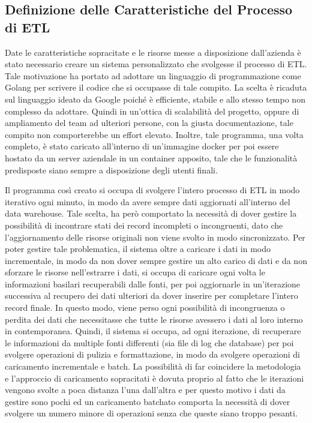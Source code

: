\subsection{Definizione delle Caratteristiche del Processo di ETL}

Date le caratteristiche sopracitate e le risorse messe a disposizione dall'azienda è stato necessario creare un sistema personalizzato che svolgesse il processo di ETL. Tale motivazione ha portato ad adottare un linguaggio di programmazione come Golang per scrivere il codice che si occupasse di tale compito. La scelta è ricaduta sul linguaggio ideato da Google poiché è efficiente, stabile e allo stesso tempo non complesso da adottare. Quindi in un'ottica di scalabilità del progetto, oppure di ampliamento del team ad ulteriori persone, con la giusta documentazione, tale compito non comporterebbe un effort elevato. Inoltre, tale programma, una volta completo, è stato caricato all'interno di un'immagine docker per poi essere hostato da un server aziendale in un container apposito, tale che le funzionalità predisposte siano sempre a disposizione degli utenti finali.

Il programma così creato si occupa di svolgere l'intero processo di ETL in modo iterativo ogni minuto, in modo da avere sempre dati aggiornati all'interno del data warehouse. Tale scelta, ha però comportato la necessità di dover gestire la possibilità di incontrare stati dei record incompleti o incongruenti, dato che l'aggiornamento delle risorse originali non viene svolto in modo sincronizzato. Per poter gestire tale problematica, il sistema oltre a caricare i dati in modo incrementale, in modo da non dover sempre gestire un alto carico di dati e da non sforzare le risorse nell'estrarre i dati, si occupa di caricare ogni volta le informazioni basilari recuperabili dalle fonti, per poi aggiornarle in un'iterazione successiva al recupero dei dati ulteriori da dover inserire per completare l'intero record finale. In questo modo, viene perso ogni possibilità di incongruenza o perdita dei dati che necessitasse che tutte le risorse avessero i dati al loro interno in contemporanea. Quindi, il sistema si occupa, ad ogni iterazione, di recuperare le informazioni da multiple fonti differenti (sia file di log che database) per poi svolgere operazioni di pulizia e formattazione, in modo da svolgere operazioni di caricamento incrementale e batch. La possibilità di far coincidere la metodologia e l'approccio di caricamento sopracitati è dovuta proprio al fatto che le iterazioni vengono svolte a poca distanza l'una dall'altra e per questo motivo i dati da gestire sono pochi ed un caricamento batchato comporta la necessità di dover svolgere un numero minore di operazioni senza che queste siano troppo pesanti.

